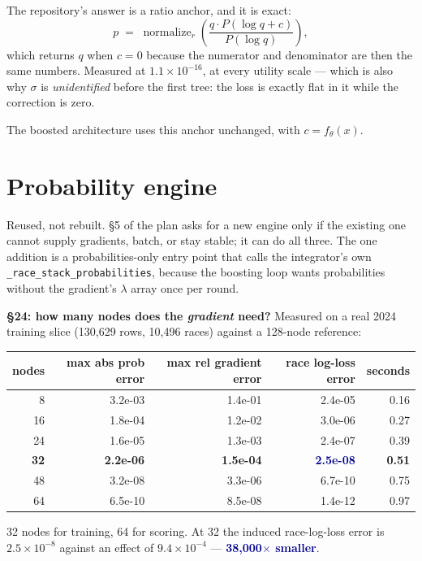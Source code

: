 \documentclass[11pt,a4paper]{article}
\newcommand{\good}[1]{\textcolor{darkblue}{\textbf{#1}}}
\begin{document}
The repository's answer is a ratio anchor, and it is exact:
\[
p \;=\; \operatorname{normalize}_r\!\left(\frac{q \cdot P(\log q + c)}{P(\log q)}\right),
\]
which returns $q$ when $c=0$ because the numerator and denominator are then the same numbers.
Measured at $1.1\times10^{-16}$, at every utility scale --- which is also why $\sigma$ is
\emph{unidentified} before the first tree: the loss is exactly flat in it while the correction is
zero.

The boosted architecture uses this anchor unchanged, with $c = f_\theta(x)$.

\section{Probability engine}

Reused, not rebuilt. §5 of the plan asks for a new engine only if the existing one cannot
supply gradients, batch, or stay stable; it can do all three. The one addition is a
probabilities-only entry point that calls the integrator's own
\texttt{\_race\_stack\_probabilities}, because the boosting loop wants probabilities without
the gradient's $\lambda$ array once per round.

\textbf{§24: how many nodes does the \emph{gradient} need?} Measured on a real 2024 training
slice (130,629 rows, 10,496 races) against a 128-node reference:

\begin{center}\small
\begin{tabular}{rrrrr}
\toprule
nodes & max abs prob error & max rel gradient error & race log-loss error & seconds \\
\midrule
8 & 3.2e-03 & 1.4e-01 & 2.4e-05 & 0.16 \\
16 & 1.8e-04 & 1.2e-02 & 3.0e-06 & 0.27 \\
24 & 1.6e-05 & 1.3e-03 & 2.4e-07 & 0.39 \\
\rowcolor{rowshade}\textbf{32} & \textbf{2.2e-06} & \textbf{1.5e-04} & \good{2.5e-08} & \textbf{0.51} \\
48 & 3.2e-08 & 3.3e-06 & 6.7e-10 & 0.75 \\
64 & 6.5e-10 & 8.5e-08 & 1.4e-12 & 0.97 \\
\bottomrule
\end{tabular}
\end{center}

32 nodes for training, 64 for scoring. At 32 the induced race-log-loss error is
$2.5\times10^{-8}$ against an effect of $9.4\times10^{-4}$ --- \good{38,000$\times$ smaller}.
\end{document}
